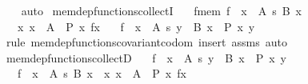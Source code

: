 \begin{isabellebody}
%
\isadelimproof
\ \ %
\endisadelimproof
%
\isatagproof
{}\isamarkupfalse%
\ auto%
\endisatagproof
{\isafoldproof}%
%
\isadelimproof
\isanewline
%
\endisadelimproof
\isanewline
{}\isamarkupfalse%
\ mem{\isacharunderscore}{\kern0pt}dep{\isacharunderscore}{\kern0pt}functions{\isacharunderscore}{\kern0pt}collectI{\isacharcolon}{\kern0pt}\isanewline
\ \ \ f{\isacharunderscore}{\kern0pt}mem{\isacharcolon}{\kern0pt}\ {\isachardoublequoteopen}f\ {\isasymin}\ {\isacharparenleft}{\kern0pt}x\ {\isasymin}\ A{\isacharparenright}{\kern0pt}\ {\isasymrightarrow}s\ {\isacharparenleft}{\kern0pt}B\ x{\isacharparenright}{\kern0pt}{\isachardoublequoteclose}\isanewline
\ \ \ {\isachardoublequoteopen}{\isasymAnd}x{\isachardot}{\kern0pt}\ x\ {\isasymin}\ A\ {\isasymLongrightarrow}\ P\ x\ {\isacharparenleft}{\kern0pt}f{\isacharbackquote}{\kern0pt}x{\isacharparenright}{\kern0pt}{\isachardoublequoteclose}\isanewline
\ \ \ {\isachardoublequoteopen}f\ {\isasymin}\ {\isacharparenleft}{\kern0pt}x\ {\isasymin}\ A{\isacharparenright}{\kern0pt}\ {\isasymrightarrow}s\ {\isacharbraceleft}{\kern0pt}y\ {\isasymin}\ B\ x\ {\isacharbar}{\kern0pt}\ P\ x\ y{\isacharbraceright}{\kern0pt}{\isachardoublequoteclose}\isanewline
%
\isadelimproof
\ \ %
\endisadelimproof
%
\isatagproof
{}\isamarkupfalse%
\ {\isacharparenleft}{\kern0pt}rule\ mem{\isacharunderscore}{\kern0pt}dep{\isacharunderscore}{\kern0pt}functions{\isacharunderscore}{\kern0pt}covariant{\isacharunderscore}{\kern0pt}codom{\isacharparenright}{\kern0pt}\ {\isacharparenleft}{\kern0pt}insert\ assms{\isacharcomma}{\kern0pt}\ auto{\isacharparenright}{\kern0pt}%
\endisatagproof
{\isafoldproof}%
%
\isadelimproof
\isanewline
%
\endisadelimproof
\isanewline
{}\isamarkupfalse%
\ mem{\isacharunderscore}{\kern0pt}dep{\isacharunderscore}{\kern0pt}functions{\isacharunderscore}{\kern0pt}collectD{\isacharcolon}{\kern0pt}\isanewline
\ \ \ {\isachardoublequoteopen}f\ {\isasymin}\ {\isacharparenleft}{\kern0pt}x\ {\isasymin}\ A{\isacharparenright}{\kern0pt}\ {\isasymrightarrow}s\ {\isacharbraceleft}{\kern0pt}y\ {\isasymin}\ B\ x\ {\isacharbar}{\kern0pt}\ P\ x\ y{\isacharbraceright}{\kern0pt}{\isachardoublequoteclose}\isanewline
\ \ \ {\isachardoublequoteopen}f\ {\isasymin}\ {\isacharparenleft}{\kern0pt}x\ {\isasymin}\ A{\isacharparenright}{\kern0pt}\ {\isasymrightarrow}s\ {\isacharparenleft}{\kern0pt}B\ x{\isacharparenright}{\kern0pt}{\isachardoublequoteclose}\ \ {\isachardoublequoteopen}{\isasymAnd}x{\isachardot}{\kern0pt}\ x\ {\isasymin}\ A\ {\isasymLongrightarrow}\ P\ x\ {\isacharparenleft}{\kern0pt}f{\isacharbackquote}{\kern0pt}x{\isacharparenright}{\kern0pt}{\isachardoublequoteclose}\isanewline

\end{isabellebody}
